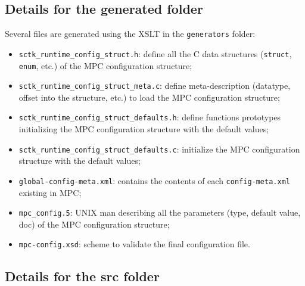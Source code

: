 \documentclass{article}
\begin{document}
\subsection{Details for the generated folder}
\label{conf_gen_config}
Several files are generated using the XSLT in the \texttt{generators} folder:
\begin{itemize}
\item \texttt{sctk\_runtime\_config\_struct.h}: define all the C data structures (\texttt{struct}, \texttt{enum}, etc.) of the MPC configuration structure;
\item \texttt{sctk\_runtime\_config\_struct\_meta.c}: define meta-description (datatype, offset into the structure, etc.) to load the MPC configuration structure;
\item \texttt{sctk\_runtime\_config\_struct\_defaults.h}: define functions prototypes initializing the MPC configuration structure with the default values;
\item \texttt{sctk\_runtime\_config\_struct\_defaults.c}: initialize the MPC configuration structure with the default values;
\item \texttt{global-config-meta.xml}: contains the contents of each \texttt{config-meta.xml} existing in MPC;
\item \texttt{mpc\_config.5}: UNIX man describing all the parameters (type, default value, doc) of the MPC configuration structure;
\item \texttt{mpc-config.xsd}: scheme to validate the final configuration file.
\end{itemize}

\subsection{Details for the src folder}
\label{conf_src_config}
\end{document}
